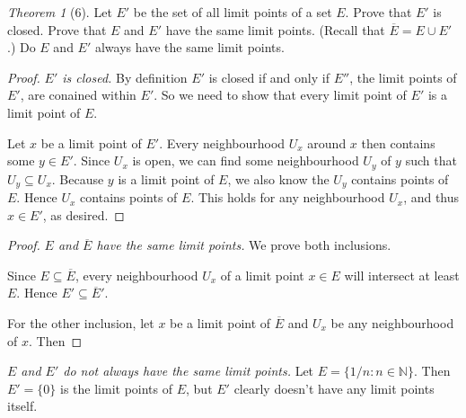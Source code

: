 \documentclass[12pt]{article}
\theoremstyle{remark}
\theoremstyle{named}
\newtheorem*{theorem}{Theorem}
\begin{document}
\begin{theorem}[6]
    Let $E'$ be the set of all limit points of a set $E$. Prove that $E'$ is closed. Prove that $E$ and $E'$ have the same limit points. (Recall that $\overline E = E \cup E'$.) Do $E$ and $E'$ always have the same limit points.
\end{theorem}

\begin{proof}
    \textit{$E'$ is closed.} By definition $E'$ is closed if and only if $E''$, the limit points of $E'$, are conained within $E'$. So we need to show that every limit point of $E'$ is a limit point of $E$.

    Let $x$ be a limit point of $E'$. Every neighbourhood $U_x$ around $x$ then contains some $y \in E'$. Since $U_x$ is open, we can find some neighbourhood $U_y$ of $y$ such that $U_y \subseteq U_x$. Because $y$ is a limit point of $E$, we also know the $U_y$ contains points of $E$. Hence $U_x$ contains points of $E$. This holds for any neighbourhood $U_x$, and thus $x \in E'$, as desired.  
\end{proof}

\begin{proof}
    \textit{$E$ and $\overline{E}$ have the same limit points.} We prove both inclusions.

    Since $E \subseteq \overline{E}$, every neighbourhood $U_x$ of a limit point $x \in E$ will intersect at least $E$. Hence $E' \subseteq \overline{E}'$.

    For the other inclusion, let $x$ be a limit point of $\overline{E}$ and $U_x$ be any neighbourhood of $x$. Then 
\end{proof}

\textit{$E$ and $E'$ do not always have the same limit points.} Let $E = \{1/n : n \in \mathbb N\}$. Then $E' = \{0\}$ is the limit points of $E$, but $E'$ clearly doesn't have any limit points itself. 
\end{document}
